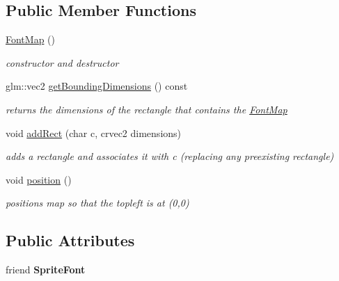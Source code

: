 \subsection*{Public Member Functions}
\begin{DoxyCompactItemize}
\item 
\mbox{\label{classnta_1_1FontMap_a1839735db2d53428126d3381dc7f3928}} 
\hyperlink{classnta_1_1FontMap_a1839735db2d53428126d3381dc7f3928}{Font\+Map} ()
\begin{DoxyCompactList}\small\item\em constructor and destructor \end{DoxyCompactList}\item 
\mbox{\label{classnta_1_1FontMap_a3e51706b5955f482f776b0d6980750b3}} 
glm\+::vec2 \hyperlink{classnta_1_1FontMap_a3e51706b5955f482f776b0d6980750b3}{get\+Bounding\+Dimensions} () const
\begin{DoxyCompactList}\small\item\em returns the dimensions of the rectangle that contains the \hyperlink{classnta_1_1FontMap}{Font\+Map} \end{DoxyCompactList}\item 
\mbox{\label{classnta_1_1FontMap_a718ff54c2a35546937602ee212bc66a9}} 
void \hyperlink{classnta_1_1FontMap_a718ff54c2a35546937602ee212bc66a9}{add\+Rect} (char c, crvec2 dimensions)
\begin{DoxyCompactList}\small\item\em adds a rectangle and associates it with c (replacing any preexisting rectangle) \end{DoxyCompactList}\item 
\mbox{\label{classnta_1_1FontMap_ada51488d206b4a609cc4a5401d90f43d}} 
void \hyperlink{classnta_1_1FontMap_ada51488d206b4a609cc4a5401d90f43d}{position} ()
\begin{DoxyCompactList}\small\item\em positions map so that the topleft is at (0,0) \end{DoxyCompactList}\end{DoxyCompactItemize}
\subsection*{Public Attributes}
\begin{DoxyCompactItemize}
\item 
\mbox{\label{classnta_1_1FontMap_af6e4081f6048d41ce15758c9cdb6092f}} 
friend {\bfseries Sprite\+Font}
\end{DoxyCompactItemize}
